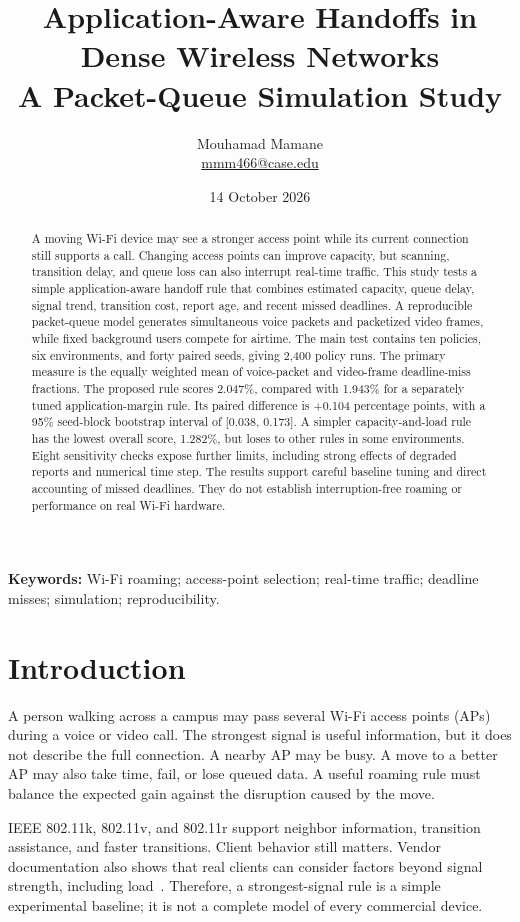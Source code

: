 \documentclass[11pt,a4paper]{article}
\title{Application-Aware Handoffs in Dense Wireless Networks\\[5pt]\large A Packet-Queue Simulation Study}
\author{Mouhamad Mamane\\\normalsize\href{mailto:mmm466@case.edu}{mmm466@case.edu}}
\date{14 October 2026}
\begin{document}
\maketitle
\begin{abstract}
A moving Wi-Fi device may see a stronger access point while its current connection still supports a call. Changing access points can improve capacity, but scanning, transition delay, and queue loss can also interrupt real-time traffic. This study tests a simple application-aware handoff rule that combines estimated capacity, queue delay, signal trend, transition cost, report age, and recent missed deadlines. A reproducible packet-queue model generates simultaneous voice packets and packetized video frames, while fixed background users compete for airtime. The main test contains ten policies, six environments, and forty paired seeds, giving 2,400 policy runs. The primary measure is the equally weighted mean of voice-packet and video-frame deadline-miss fractions. The proposed rule scores 2.047\%, compared with 1.943\% for a separately tuned application-margin rule. Its paired difference is +0.104 percentage points, with a 95\% seed-block bootstrap interval of [0.038, 0.173]. A simpler capacity-and-load rule has the lowest overall score, 1.282\%, but loses to other rules in some environments. Eight sensitivity checks expose further limits, including strong effects of degraded reports and numerical time step. The results support careful baseline tuning and direct accounting of missed deadlines. They do not establish interruption-free roaming or performance on real Wi-Fi hardware.
\end{abstract}
\noindent\textbf{Keywords:} Wi-Fi roaming; access-point selection; real-time traffic; deadline misses; simulation; reproducibility.

\section{Introduction}
A person walking across a campus may pass several Wi-Fi access points (APs) during a voice or video call. The strongest signal is useful information, but it does not describe the full connection. A nearby AP may be busy. A move to a better AP may also take time, fail, or lose queued data. A useful roaming rule must balance the expected gain against the disruption caused by the move.

IEEE 802.11k, 802.11v, and 802.11r support neighbor information, transition assistance, and faster transitions. Client behavior still matters. Vendor documentation also shows that real clients can consider factors beyond signal strength, including load~\cite{M01}. Therefore, a strongest-signal rule is a simple experimental baseline; it is not a complete model of every commercial device.
\end{document}
